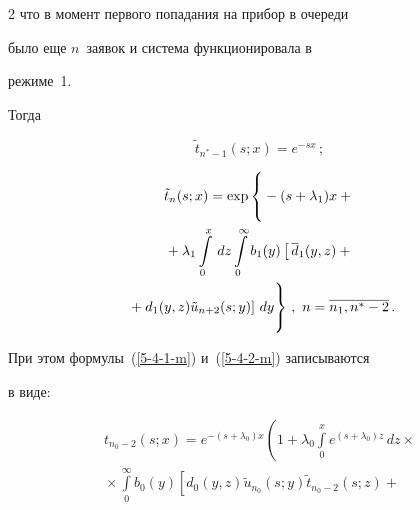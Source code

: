 \begin{multicols}{2}
что в момент первого попадания на прибор в очереди


было еще $n$~заявок и система функционировала в


режиме~1.


Тогда




$$


\tilde{t}_{n^*-1}(s;x) = e^{-sx}\,;


$$







\vspace*{-12pt}





\noindent


\begin{multline*}


\tilde{t}_n(s;x) = \exp\left\{ \vphantom{\int\limits_0^x}


- (s + \lambda_1) x + {}\right.\\


{}+\lambda_1 \int\limits_0^x \,dz


\int\limits_0^\infty b_1(y) \left[\,\d_1(y,z) +{}\right.\\


\left.\left.{}+ d_1(y,z) \tilde{u}_{n+2}(s;y)\right] \, dy


\vphantom{\int\limits_0^\infty}


\right\}\,,\


n=\overline{n_1,n^*-2}\,.


\end{multline*}


При этом формулы~(\ref{5-4-1-m}) и~(\ref{5-4-2-m}) записываются


в виде:


\begin{multline*}


t_{n_0-2}(s;x)= e^{-(s + \lambda_0) x} \left( 


1 +


\lambda_0 \int\limits_0^x e^{(s + \lambda_0) z}\, dz\times{} \right.\\


{}\times


\int\limits_0^\infty b_0(y) \left[d_0(y,z) \tilde{u}_{n_0}(s;y) \tilde{t}_{n_0-2}(s;z)


+ {}\right.\\



\end{multline*}
\end{multicols}
